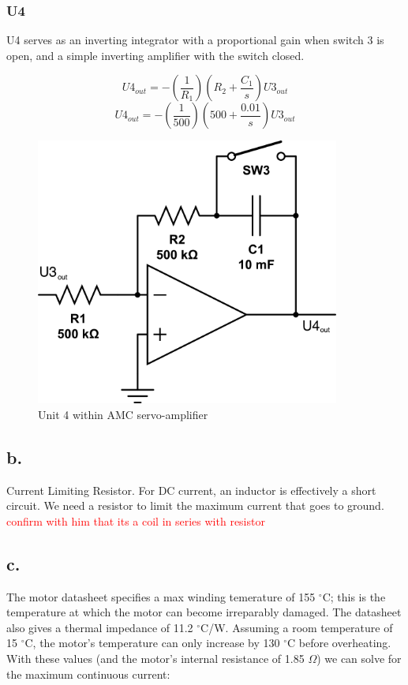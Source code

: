 \documentclass{article}
\newcommand{\xxx}[1]{\textcolor{red}{#1}}
\theoremstyle{plain}
\theoremstyle{definition}
\theoremstyle{remark}
\begin{document}
\subsubsection*{U4}

U4 serves as an inverting integrator with a proportional gain when switch 3 is open, and a simple inverting amplifier with the switch closed.

$$U4_{out} = - \left( \frac{1}{R_1} \right) \left( R_2 + \frac{C_1}{s} \right) U3_{out} $$
$$U4_{out} = - \left( \frac{1}{500} \right) \left( 500 + \frac{0.01}{s} \right) U3_{out} $$

\begin{figure}
\begin{center}
\includegraphics[width = 10cm]{q1a_u4.png}
\caption{Unit 4 within AMC servo-amplifier}
\label{q1_au4}
\end{center}
\end{figure}

\subsection*{b.}
Current Limiting Resistor.
For DC current, an inductor is effectively a short circuit.  We need a resistor to limit the maximum current that goes to ground.
\xxx{confirm with him that its a coil in series with resistor}

\subsection*{c.}
The motor datasheet specifies a max winding temerature of 155 $^\circ$C; this is the temperature at which the motor can become irreparably damaged. The datasheet also gives a thermal impedance of 11.2 $^\circ$C/W. Assuming a room temperature of 15 $^\circ$C, the motor's temperature can only increase by 130 $^\circ$C before overheating. With these values (and the motor's internal resistance of 1.85 $\Omega$) we can solve for the maximum continuous current:
\end{document}
